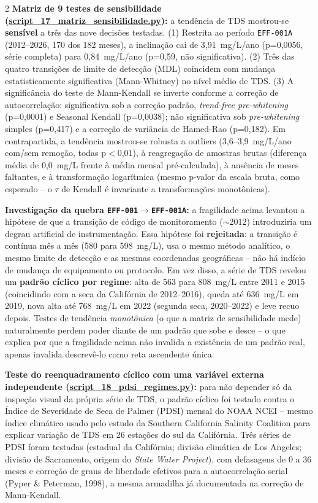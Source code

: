\begin{multicols*}{2}
\textbf{Matriz de 9 testes de sensibilidade (\url{script_17_matriz_sensibilidade.py}):} a tendência de TDS mostrou-se \textbf{sensível} a três das nove decisões testadas. (1) Restrita ao período \texttt{EFF-001A} (2012--2026, 170 dos 182 meses), a inclinação cai de 3,91~mg/L/ano (p=0,0056, série completa) para 0,84~mg/L/ano (p=0,59, não significativa). (2) Três das quatro transições de limite de detecção (MDL) coincidem com mudança estatisticamente significativa (Mann-Whitney) no nível médio de TDS. (3) A significância do teste de Mann-Kendall se inverte conforme a correção de autocorrelação: significativa sob a correção padrão, \textit{trend-free pre-whitening} (p=0,0001) e Seasonal Kendall (p=0,0038); não significativa sob \textit{pre-whitening} simples (p=0,417) e a correção de variância de Hamed-Rao (p=0,182). Em contrapartida, a tendência mostrou-se robusta a outliers (3,6--3,9~mg/L/ano com/sem remoção, todas p$<$0,01), à reagregação de amostras brutas (diferença média de 0,0~mg/L frente à média mensal pré-calculada), à ausência de meses faltantes, e à transformação logarítmica (mesmo p-valor da escala bruta, como esperado -- o $\tau$ de Kendall é invariante a transformações monotônicas).

\textbf{Investigação da quebra \texttt{EFF-001}$\to$\texttt{EFF-001A}:} a fragilidade acima levantou a hipótese de que a transição de código de monitoramento ($\sim$2012) introduziria um degrau artificial de instrumentação. Essa hipótese foi \textbf{rejeitada}: a transição é contínua mês a mês (580 para 598~mg/L), usa o mesmo método analítico, o mesmo limite de detecção e as mesmas coordenadas geográficas -- não há indício de mudança de equipamento ou protocolo. Em vez disso, a série de TDS revelou um \textbf{padrão cíclico por regime}: alta de 563 para 808~mg/L entre 2011 e 2015 (coincidindo com a seca da Califórnia de 2012--2016), queda até 636~mg/L em 2019, nova alta até 768~mg/L em 2022 (segunda seca, 2020--2022) e leve recuo depois. Testes de tendência \textit{monotônica} (o que a matriz de sensibilidade mede) naturalmente perdem poder diante de um padrão que sobe e desce -- o que explica por que a fragilidade acima não invalida a existência de um padrão real, apenas invalida descrevê-lo como reta ascendente única.

\textbf{Teste do reenquadramento cíclico com uma variável externa independente (\url{script_18_pdsi_regimes.py}):} para não depender só da inspeção visual da própria série de TDS, o padrão cíclico foi testado contra o Índice de Severidade de Seca de Palmer (PDSI) mensal do NOAA NCEI -- mesmo índice climático usado pelo estudo da Southern California Salinity Coalition \cite{scsc2018tds} para explicar variação de TDS em 26 estações do sul da Califórnia. Três séries de PDSI foram testadas (estadual da Califórnia; divisão climática de Los Angeles; divisão de Sacramento, origem do \textit{State Water Project}), com defasagens de 0 a 36 meses e correção de graus de liberdade efetivos para a autocorrelação serial (Pyper \& Peterman, 1998), a mesma armadilha já documentada na correção de Mann-Kendall.


\end{multicols*}
